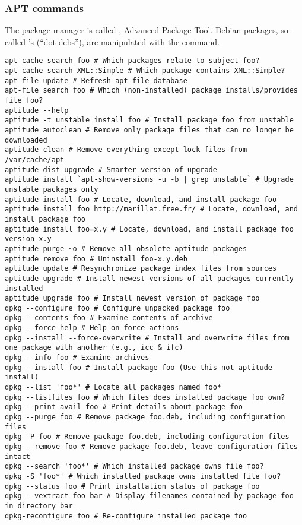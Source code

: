 \documentclass[12pt,twoside]{article}
\begin{document}
\subsubsection{APT commands}\label{sxn:apt}
The  package manager is called , Advanced
Package Tool.
Debian packages, so-called 's (``dot debs''), are
manipulated with the  command. 
\begin{verbatim}
apt-cache search foo # Which packages relate to subject foo?
apt-cache search XML::Simple # Which package contains XML::Simple?
apt-file update # Refresh apt-file database
apt-file search foo # Which (non-installed) package installs/provides file foo?
aptitude --help
aptitude -t unstable install foo # Install package foo from unstable
aptitude autoclean # Remove only package files that can no longer be downloaded
aptitude clean # Remove everything except lock files from /var/cache/apt
aptitude dist-upgrade # Smarter version of upgrade
aptitude install `apt-show-versions -u -b | grep unstable` # Upgrade unstable packages only
aptitude install foo # Locate, download, and install package foo
aptitude install foo http://marillat.free.fr/ # Locate, download, and install package foo
aptitude install foo=x.y # Locate, download, and install package foo version x.y
aptitude purge ~o # Remove all obsolete aptitude packages
aptitude remove foo # Uninstall foo-x.y.deb
aptitude update # Resynchronize package index files from sources
aptitude upgrade # Install newest versions of all packages currently installed
aptitude upgrade foo # Install newest version of package foo
dpkg --configure foo # Configure unpacked package foo
dpkg --contents foo # Examine contents of archive
dpkg --force-help # Help on force actions
dpkg --install --force-overwrite # Install and overwrite files from one package with another (e.g., icc & ifc)
dpkg --info foo # Examine archives
dpkg --install foo # Install package foo (Use this not aptitude install)
dpkg --list 'foo*' # Locate all packages named foo*
dpkg --listfiles foo # Which files does installed package foo own?
dpkg --print-avail foo # Print details about package foo
dpkg --purge foo # Remove package foo.deb, including configuration files
dpkg -P foo # Remove package foo.deb, including configuration files
dpkg --remove foo # Remove package foo.deb, leave configuration files intact
dpkg --search 'foo*' # Which installed package owns file foo?
dpkg -S 'foo*' # Which installed package owns installed file foo?
dpkg --status foo # Print installation status of package foo
dpkg --vextract foo bar # Display filenames contained by package foo in directory bar
dpkg-reconfigure foo # Re-configure installed package foo
\end{verbatim}
\end{document}
